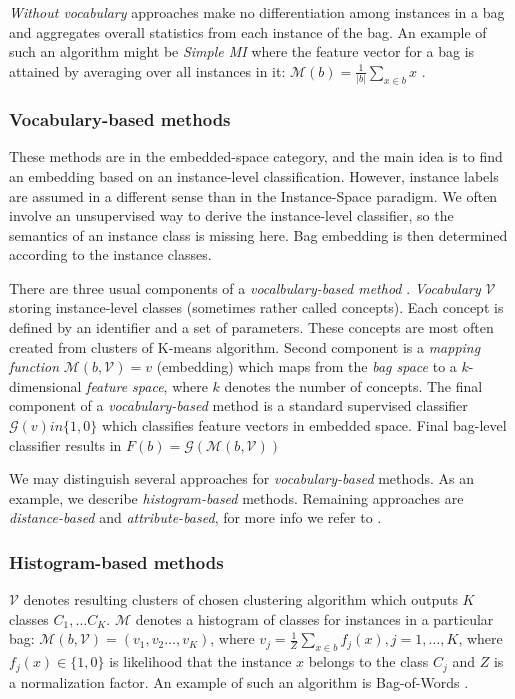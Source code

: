 \emph{Without vocabulary} approaches make no differentiation among instances in a bag and aggregates overall statistics from each instance of the bag. An example of such an algorithm might be \emph{Simple MI} where the feature vector for a bag is attained by averaging over all instances in it: $\mathcal{M}(b)=\frac{1}{|b|}\sum_{x\in b}x$ \cite{Dong2006}.

\subsubsection{Vocabulary-based methods}
These methods are in the embedded-space category, and the main idea is to find an embedding based on an instance-level classification. However, instance labels are assumed in a different sense than in the Instance-Space paradigm. We often involve an unsupervised way to derive the instance-level classifier, so the semantics of an instance class is missing here. Bag embedding is then determined according to the instance classes.

There are three usual components of a \emph{vocalbulary-based method} \cite{Amores2013}. \emph{Vocabulary} $\mathcal{V}$ storing instance-level classes (sometimes rather called concepts). Each concept is defined by an identifier and a set of parameters. These concepts are most often created from clusters of K-means algorithm. Second component is a \emph{mapping function} $\mathcal{M}(b, \mathcal{V})=v$ (embedding) which maps from the \emph{bag space} to  a $k$-dimensional \emph{feature space}, where $k$ denotes the number of concepts. The final component of a \emph{vocabulary-based} method is a standard supervised classifier $\mathcal{G}(v) in \{1,0\}$ which classifies feature vectors in embedded space. Final bag-level classifier results in $F(b)=\mathcal{G}(\mathcal{M}(b,\mathcal{V}))$

We may distinguish several approaches for \emph{vocabulary-based} methods. As an example, we describe \emph{histogram-based} methods. Remaining approaches are \emph{distance-based} and \emph{attribute-based}, for more info we refer to \cite{Amores2013}.

\subsubsection{Histogram-based methods}
$\mathcal{V}$ denotes resulting clusters of chosen clustering algorithm which outputs $K$ classes $C_1,\dots C_K$. $\mathcal{M}$ denotes a histogram of classes for instances in a particular bag: $\mathcal{M}(b,\mathcal{V})=(v_1,v_2\dots,v_K)$, where $v_j=\frac{1}{Z}\sum_{x\in b}f_{j}(x), j=1,\dots,K$, where $f_{j}(x) \in \{1,0\}$ is likelihood that the instance $x$ belongs to the class $C_j$ and $Z$ is a normalization factor. An example of such an algorithm is Bag-of-Words \cite{Nowak2006}.

